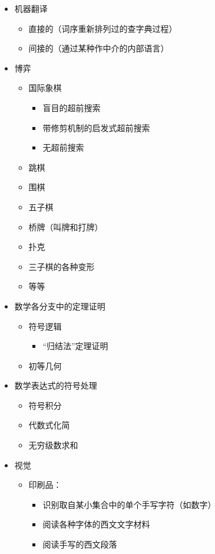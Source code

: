 \begin{itemize}
\item 机器翻译
  \begin{itemize}
  \item 直接的（词序重新排列过的查字典过程）
  \item 间接的（通过某种作中介的内部语言）
  \end{itemize}
\item 博弈
  \begin{itemize}
  \item 国际象棋
    \begin{itemize}
    \item 盲目的超前搜索
    \item 带修剪机制的启发式超前搜索
    \item 无超前搜索
    \end{itemize}
  \item 跳棋
  \item 围棋
  \item 五子棋
  \item 桥牌（叫牌和打牌）
  \item 扑克
  \item 三子棋的各种变形
  \item 等等
  \end{itemize}
\item 数学各分支中的定理证明
  \begin{itemize}
  \item 符号逻辑
    \begin{itemize}
    \item “归结法”定理证明
    \end{itemize}
  \item 初等几何
  \end{itemize}
\item 数学表达式的符号处理
  \begin{itemize}
  \item 符号积分
  \item 代数式化简
  \item 无穷级数求和
  \end{itemize}
\item 视觉
  \begin{itemize}
  \item 印刷品：
    \begin{itemize}
    \item 识别取自某小集合中的单个手写字符（如数字）
    \item 阅读各种字体的西文文字材料
    \item 阅读手写的西文段落

\end{itemize}
\end{itemize}
\end{itemize}
